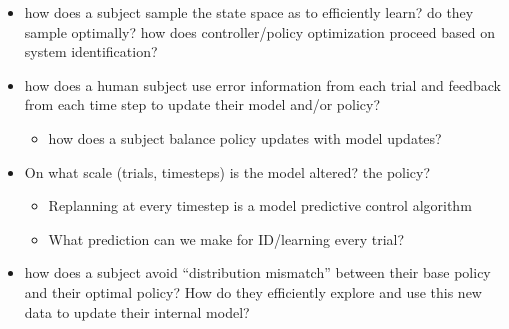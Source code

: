 {            \begin{itemize}
            \tightlist
            \item
              how does a subject sample the state space as to
              efficiently learn? do they sample optimally? how does
              controller/policy optimization proceed based on system
              identification?
            \item
              how does a human subject use error information from each
              trial and feedback from each time step to update their
              model and/or policy?

              \begin{itemize}
              \tightlist
              \item
                how does a subject balance policy updates with model
                updates?
              \end{itemize}
            \item
              On what scale (trials, timesteps) is the model altered?
              the policy?

              \begin{itemize}
              \tightlist
              \item
                Replanning at every timestep is a model predictive
                control algorithm
              \item
                What prediction can we make for ID/learning every trial?
              \end{itemize}
            \item
              how does a subject avoid ``distribution mismatch'' between
              their base policy and their optimal policy? How do they
              efficiently explore and use this new data to update their
              internal model?


\end{itemize}}
